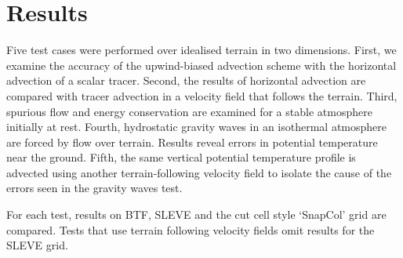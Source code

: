 \chapter{Results}
\label{sec:results}

Five test cases were performed over idealised terrain in two dimensions.  First, we examine the accuracy of the upwind-biased advection scheme with the horizontal advection of a scalar tracer.  Second, the results of horizontal advection are compared with tracer advection in a velocity field that follows the terrain.  Third, spurious flow and energy conservation are examined for a stable atmosphere initially at rest.  Fourth, hydrostatic gravity waves in an isothermal atmosphere are forced by flow over terrain.  Results reveal errors in potential temperature near the ground.  Fifth, the same vertical potential temperature profile is advected using another terrain-following velocity field to isolate the cause of the errors seen in the gravity waves test.

For each test, results on BTF, SLEVE and the cut cell style `SnapCol' grid are compared.  Tests that use terrain following velocity fields omit results for the SLEVE grid.






